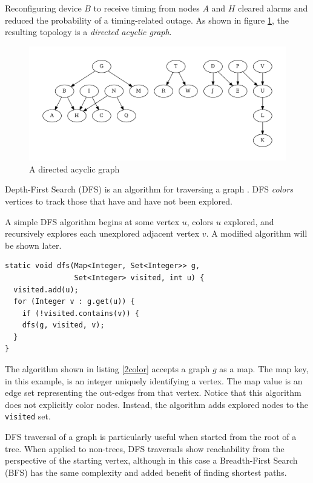 \documentclass{book}
\begin{document}
Reconfiguring device $B$ to receive timing from nodes $A$ and $H$ cleared alarms and reduced the probability of a timing-related outage. As shown in figure \ref{noloop}, the resulting topology is a \textit{directed acyclic graph}.

\begin{figure}
\centering
\includegraphics[width=\columnwidth]{figures/noloop}
\caption{A directed acyclic graph}
\label{noloop}
\end{figure}

Depth-First Search (DFS) is an algorithm for traversing a graph \cite{Aho:1992:FCS:114768}. DFS \textit{colors} vertices to track those that have and have not been explored. 

A simple DFS algorithm begins at some vertex $u$, colors $u$ explored, and recursively explores each unexplored adjacent vertex $v$. A modified algorithm will be shown later.

\begin{lstlisting}[columns=fixed,caption={A simple DFS function of two colors},label={2color}]
static void dfs(Map<Integer, Set<Integer>> g,
                Set<Integer> visited, int u) {
  visited.add(u);
  for (Integer v : g.get(u)) {
    if (!visited.contains(v)) {
    dfs(g, visited, v);
  }
}
\end{lstlisting}

The algorithm shown in listing \ref{2color} accepts a graph $g$ as a map. The map key, in this example, is an integer uniquely identifying a vertex. The map value is an edge set representing the out-edges from that vertex. Notice that this algorithm does not explicitly color nodes. Instead, the algorithm adds explored nodes to the \texttt{visited} set.

DFS traversal of a graph is particularly useful when started from the root of a tree. When applied to non-trees, DFS traversals show reachability from the perspective of the starting vertex, although in this case a Breadth-First Search (BFS) has the same complexity and added benefit of finding shortest paths.
\end{document}
